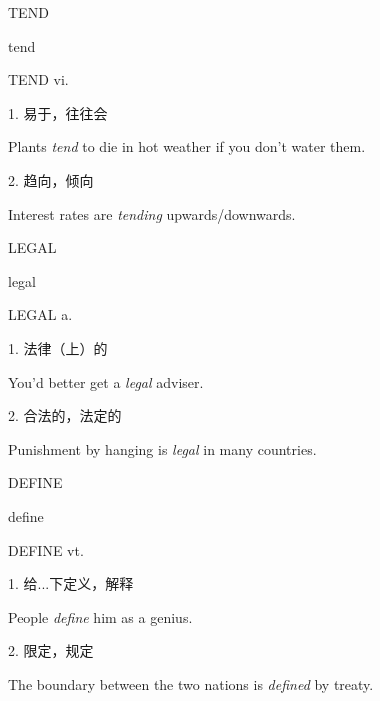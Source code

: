 \begin{flashcard}{
TEND

tend
}
\begin{center}
TEND vi. \textipa{[tend]}
\end{center}
1. 易于，往往会

Plants \textit{tend} to die in hot weather if you don't water them.

2. 趋向，倾向

Interest rates are \textit{tending} upwards/downwards.

\end{flashcard}
\begin{flashcard}{
LEGAL

legal
}
\begin{center}
LEGAL a. 
\end{center}
1. 法律（上）的

You'd better get a \textit{legal} adviser.

2. 合法的，法定的

Punishment by hanging is \textit{legal} in many countries.

\end{flashcard}
\begin{flashcard}{
DEFINE

define
}
\begin{center}
DEFINE vt. 
\end{center}
1. 给...下定义，解释

People \textit{define} him as a genius.

2. 限定，规定

The boundary between the two nations is \textit{defined} by treaty.

\end{flashcard}
